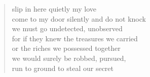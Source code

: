 \begin{verse}
slip in here quietly my love \\
come to my door silently and do not knock \\
we must go undetected, unobserved \\
for if they knew the treasures we carried \\
or the riches we possessed together  \\
we would surely be robbed, pursued, \\
run to ground to steal our secret
\end{verse}
